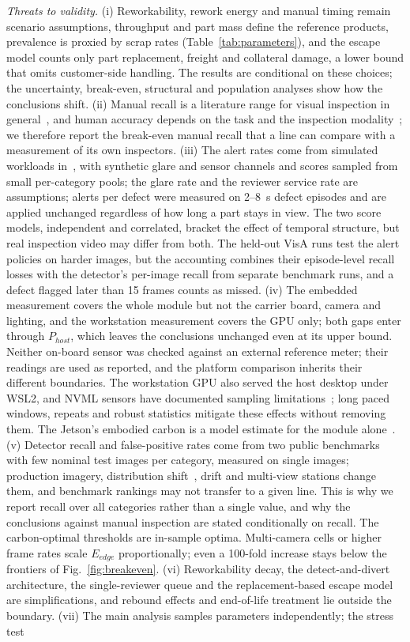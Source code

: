 \emph{Threats to validity.} (i) Reworkability, rework energy and manual timing remain scenario assumptions, throughput and part mass define the reference products, prevalence is proxied by scrap rates (Table~\ref{tab:parameters}), and the escape model counts only part replacement, freight and collateral damage, a lower bound that omits customer-side handling. The results are conditional on these choices; the uncertainty, break-even, structural and population analyses show how the conclusions shift. (ii) Manual recall is a literature range for visual inspection in general~\cite{see2012visual}, and human accuracy depends on the task and the inspection modality~\cite{aust2021comparison}; we therefore report the break-even manual recall that a line can compare with a measurement of its own inspectors. (iii) The alert rates come from simulated workloads in~\cite{sengar2026paperA}, with synthetic glare and sensor channels and scores sampled from small per-category pools; the glare rate and the reviewer service rate are assumptions; alerts per defect were measured on 2--8~s defect episodes and are applied unchanged regardless of how long a part stays in view. The two score models, independent and correlated, bracket the effect of temporal structure, but real inspection video may differ from both. The held-out VisA runs test the alert policies on harder images, but the accounting combines their episode-level recall losses with the detector's per-image recall from separate benchmark runs, and a defect flagged later than 15 frames counts as missed. (iv) The embedded measurement covers the whole module but not the carrier board, camera and lighting, and the workstation measurement covers the GPU only; both gaps enter through $P_{host}$, which leaves the conclusions unchanged even at its upper bound. Neither on-board sensor was checked against an external reference meter; their readings are used as reported, and the platform comparison inherits their different boundaries. The workstation GPU also served the host desktop under WSL2, and NVML sensors have documented sampling limitations~\cite{yang2024accurate}; long paced windows, repeats and robust statistics mitigate these effects without removing them. The Jetson's embodied carbon is a model estimate for the module alone~\cite{halder2025carbon,gupta2022act}. (v) Detector recall and false-positive rates come from two public benchmarks with few nominal test images per category, measured on single images; production imagery, distribution shift~\cite{pemula2025robust}, drift and multi-view stations change them, and benchmark rankings may not transfer to a given line. This is why we report recall over all \DetCategories{} categories rather than a single value, and why the conclusions against manual inspection are stated conditionally on recall. The carbon-optimal thresholds are in-sample optima. Multi-camera cells or higher frame rates scale $E_{edge}$ proportionally; even a 100-fold increase stays below the frontiers of Fig.~\ref{fig:breakeven}. (vi) Reworkability decay, the detect-and-divert architecture, the single-reviewer queue and the replacement-based escape model are simplifications, and rebound effects and end-of-life treatment lie outside the boundary. (vii) The main analysis samples parameters independently; the stress test 